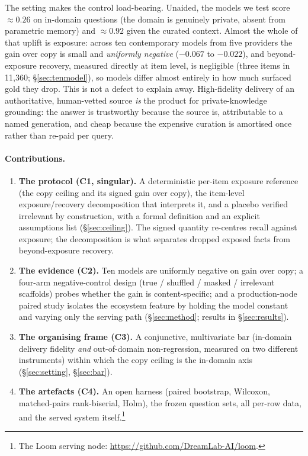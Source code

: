 \documentclass[10pt,twocolumn]{article}
\begin{document}
The setting makes the control load-bearing. Unaided, the models we test score $\approx0.26$ on
in-domain questions (the domain is genuinely private, absent from parametric memory) and
$\approx0.92$ given the curated context. Almost the whole of that uplift is exposure: across ten
contemporary models from five providers the gain over copy is small and \emph{uniformly negative}
($-0.067$ to $-0.022$), and beyond-exposure recovery, measured directly at item level, is negligible
(three items in 11{,}360; \S\ref{sec:tenmodel}), so models differ almost entirely in how much surfaced
gold they drop. This is not a defect to explain
away. High-fidelity delivery of an authoritative, human-vetted source \emph{is} the product for
private-knowledge grounding: the answer is trustworthy because the source is, attributable to a
named generation, and cheap because the expensive curation is amortised once rather than re-paid
per query.

\paragraph{Contributions.}
\begin{enumerate}[topsep=2pt,itemsep=1pt]
\item \textbf{The protocol (C1, singular).} A deterministic per-item exposure reference (the copy
ceiling and its signed gain over copy), the item-level exposure/recovery decomposition that interprets
it, and a placebo verified irrelevant by construction, with a formal definition and an explicit
assumptions list (\S\ref{sec:ceiling}). The signed quantity re-centres recall against exposure; the
decomposition is what separates dropped exposed facts from beyond-exposure recovery.
\item \textbf{The evidence (C2).} Ten models are uniformly negative on gain over copy; a four-arm
negative-control design (true / shuffled / masked / irrelevant scaffolds) probes whether the gain is
content-specific; and a production-node paired study isolates the ecosystem feature by
holding the model constant and varying only the serving path (\S\ref{sec:method}; results in
\S\ref{sec:results}).
\item \textbf{The organising frame (C3).} A conjunctive, multivariate bar (in-domain delivery
fidelity \emph{and} out-of-domain non-regression, measured on two different instruments) within
which the copy ceiling is the in-domain axis (\S\ref{sec:setting}, \S\ref{sec:bar}).
\item \textbf{The artefacts (C4).} An open harness (paired bootstrap, Wilcoxon, matched-pairs
rank-biserial, Holm), the frozen question sets, all per-row data, and the served system
itself.\footnote{The Loom serving node: \url{https://github.com/DreamLab-AI/loom}.}
\end{enumerate}
\end{document}
